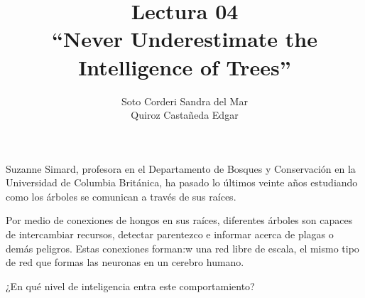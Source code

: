 \documentclass[12pt]{extreport}
\title{
    Lectura 04\\ 
    ``Never Underestimate the Intelligence of Trees''
}
\author{
    Soto Corderi Sandra del Mar\\
    Quiroz Castañeda Edgar \\
}
\makeatletter
\renewcommand{\maketitle}{
    \bgroup\setlength{\parindent}{0pt}

    \begin{flushright}
        \@author
    \end{flushright}

    \begin{flushleft}
        \textbf{\@title}
    \end{flushleft}

    \egroup
}
\makeatother
\begin{document}
    \maketitle
    Suzanne Simard, profesora en el Departamento de Bosques y Conservación en la
    Universidad de Columbia Británica, ha pasado lo últimos veinte años 
    estudiando como los árboles se comunican a través de sus raíces.

    Por medio de conexiones de hongos en sus raíces, diferentes árboles son 
    capaces de intercambiar recursos, detectar parentezco e informar acerca de
    plagas o demás peligros. Estas conexiones forman:w
     una red libre de escala, el
    mismo tipo de red que formas las neuronas en un cerebro humano.

    ¿En qué nivel de inteligencia entra este comportamiento?
\end{document}
